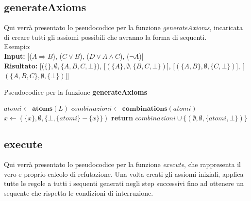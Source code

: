 \documentclass[\main/tesi.tex]{subfiles}
\begin{document}
\subsection{generateAxioms}
Qui verrà presentato lo pseudocodice per la funzione \textit{generateAxioms}, incaricata di creare tutti gli assiomi possibili che avranno la forma di sequenti. \\
Esempio: \\
\textbf{Input:} [($A \Rightarrow B$), ($C \lor B$), ($D \lor A \land C$), ($\neg A$)] \\
\textbf{Risultato:} [($\{\}, \emptyset, \{A, B, C, \bot\}$), [$(\{A\}, \emptyset, \{B, C, \bot\})$], [$(\{A, B\}, \emptyset, \{C, \bot\})$], [$(\{A, B, C\}, \emptyset, \{\bot\})$]]

\begin{algorithm}
    \caption{Pseudocodice per la funzione \textbf{generateAxioms}}\label{alg:generateAxioms}
    \begin{algorithmic}
        \State $atomi \gets \textbf{atoms}(L)$
        \State $combinazioni \gets \textbf{combinations}(atomi)$
        \State $x \gets (\{x\}, \emptyset, \{\bot, \{atomi\} - \{x\}\})$
        \EndFor
        \State \textbf{return} $combinazioni \cup \{(\emptyset, \emptyset, \{atomi, \bot\})\}$
        \EndFunction
    \end{algorithmic}
\end{algorithm}

\subsection{execute}
Qui verrà presentato lo pseudocodice per la funzione \textit{execute}, che rappresenta il vero e proprio calcolo di refutazione. Una volta creati gli assiomi iniziali, applica tutte le regole a tutti i sequenti generati negli step successivi fino ad ottenere un sequente che rispetta le condizioni di interruzione. \\
\end{document}
